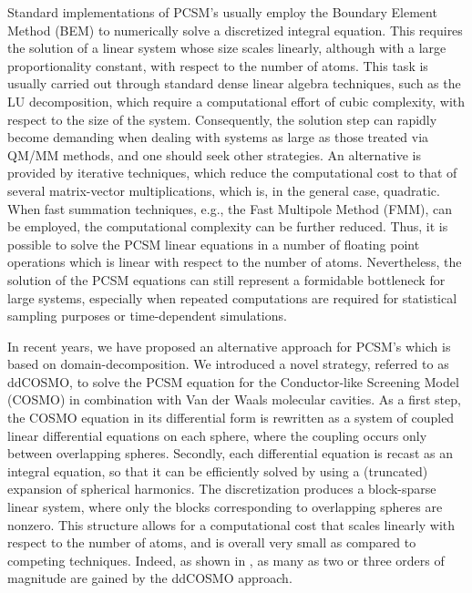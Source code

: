 Standard implementations of PCSM's usually employ the Boundary Element Method\cite{MST,ReviewPCM_1994,ReviewPCM_2005,Scalmani_JCP_CSC,York_JPCA_CSC,
Herbert_JCP_ISWIG} (BEM) to numerically solve a discretized integral equation. This requires the solution of a linear system whose size scales linearly, although with a large proportionality constant, with respect to the number of atoms. This task is usually carried out through standard dense linear algebra techniques, such as the LU decomposition\cite{Cammi_JCC_Inversion}, which require a computational effort of cubic complexity, with respect to the size of the system. Consequently, the solution step can rapidly become demanding when dealing with systems as large as those treated via QM/MM methods, and one should seek other strategies. An alternative is provided by iterative techniques, which reduce the computational cost to that of several matrix-vector multiplications\cite{Scalmani_TCA_Iterative}, which is, in  the general case, quadratic. When fast summation techniques, e.g., the Fast Multipole Method (FMM)\cite{FMM}, can be employed, the computational complexity can be further reduced. Thus, it is possible to solve the PCSM linear equations in a number of floating point operations which is linear with respect to the number of atoms. Nevertheless, the solution of the PCSM equations can still represent a formidable bottleneck for large systems\cite{Lipparini_JPCL_ddCOSMO}, especially when repeated computations are required for statistical sampling purposes or time-dependent simulations.

In recent years, we have proposed an alternative approach for PCSM's which is based on  domain-decomposition. We introduced a novel strategy\cite{Cances_JCP_ddCOSMO}, referred to as ddCOSMO\cite{Cances_JCP_ddCOSMO,Lipparini_JCTC_ddCOSMO,Lipparini_JPCL_ddCOSMO,Lipparini_JCP_ddCOSMO-QM}, to solve the PCSM equation for the Conductor-like Screening Model\cite{Klamt_JCS_Cosmo} (COSMO) in combination with Van der Waals molecular cavities. 
As a first step, the COSMO equation in its differential form is rewritten as a system of coupled linear differential equations on each sphere, where the coupling occurs only between overlapping spheres. Secondly, each differential equation is recast as an integral equation, so that it can be efficiently solved by using a (truncated) expansion of spherical harmonics\cite{Cances_JCP_ddCOSMO}. The discretization produces a block-sparse linear system\cite{Lipparini_JCTC_ddCOSMO}, where only the blocks corresponding to overlapping spheres are nonzero. This structure allows for a computational cost that scales linearly with respect to the number of atoms, and is overall very small as compared to competing techniques. Indeed, as shown in \cite{Lipparini_JPCL_ddCOSMO}, as many as two or three orders of magnitude are gained by the ddCOSMO approach.


